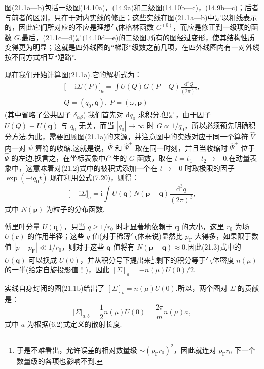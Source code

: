 图(21.1a—b)包括一级图(14.10a)，(14.9a)和二级图(14.10b—c)，(14.9b—c)；后者与前者的区别，只在于对内实线的修正；这些实线在图(21.1a—b)中是以粗线表示的，因此它们所对应的不应是理想气体格林函数 $G^{(0)}$，而应是修正到一级项的函数 $G$.最后，(21.1c—d)是(14.10d—e)的二级图.所有的图经过变形，使其结构性质变得更为明显；这就是四外线图的“梯形”级数之前几项，在四外线图内有一对外线按不同方式相互“短路”.

现在我们开始计算图(21.1a).它的解析式为：
\begin{equation}
\begin{gathered}
  \bigl[-\mathrm{i}\Sigma(P)\bigr]_a=\int U(Q)G(P-Q)\frac{\mathrm{d}^4Q}{(2\pi)^4},\\
  Q=(q_0,\bm{q}),\ P=(\omega,\bm{p})
\end{gathered}
\end{equation}
(其中省略了公共因子 $\delta_{\alpha\beta}$).我们首先对 $\mathrm{d}q_0$ 求积分.但是，由于因子 $U(Q)\equiv U(\bm{q})$ 与 $q_0$ 无关，而当 $|q_0|\to\infty$ 时 $G\propto1/q_0$，所以必须预先明确积分方法.为此，需要回顾图(21.1a)的来源，并注意图中的实线对应于同一个算符 $\hat{V}$ 内一对 $\psi$ 算符的收缩.这就是说，$\hat{\Psi}$ 和 $\hat{\Psi}^{+}$ 取在同一时刻，并且当收缩时 $\hat{\Psi}^{+}$ 位于 $\hat{\Psi}$ 的左边.换言之，在坐标表象中产生的 $G$ 函数，取在 $t=t_1-t_2\to-0$.在动量表象中，这意味着对(21.2)式中的被积式添加一个在 $t\to-0$ 时取极限的因子 $\exp(-\mathrm{i}q_0t)$.现在利用公式(7.20)，则得：
\begin{equation}
  \bigl[-\mathrm{i}\Sigma\bigr]_a=\mathrm{i}\int U(\bm{q})N(\bm{p}-\bm{q})\frac{\mathrm{d}^3q}{(2\pi)^3},
\end{equation}
式中 $N(\bm p)$ 为粒子的分布函数.

傅里叶分量 $U(\bm{q})$，只当 $q\geqslant1/r_0$ 时才显著地依赖于 $\bm q$ 的大小，这里 $r_0$ 为场 $U(\bm r)$ 的作用半径；这些 $q$ 值(对于稀薄气体来说)显然比 $p_{\mathrm{F}}$ 大得多，如果限于数值 $|p-p_{\mathrm{F}}|\ll1/r_0$，则对于这些 $\bm q$ 值将有 $N(\bm{p}-\bm{q})\approx0$.因此(21.3)式中的 $U(\bm{q})$ 可以换成 $U(0)$，并从积分号下提出来\footnote{于是不难看出，允许误差的相对数量级 $\sim(p_{\mathrm{F}}r_0)^2$，因此就连对 $p_{\mathrm{F}}r_0$ 下一个数量级的各项也影响不到.}.剩下的积分等于气体密度 $n(\mu)$ 的一半(给定自旋投影值！)，因此 $[\Sigma]_a=-n(\mu)U(0)/2$.

实线自身封闭的图(21.1b)给出了 $[\Sigma]_b=n(\mu)U(0)$.所以，两个图对 $\Sigma$ 的贡献是：
\begin{equation}
  \bigl[\Sigma\bigr]_{a,b}=\frac{1}{2}n(\mu)U(0)=\frac{2\pi}{m}n(\mu)a,
\end{equation}
式中 $a$ 为根据(6.2)式定义的散射长度.


